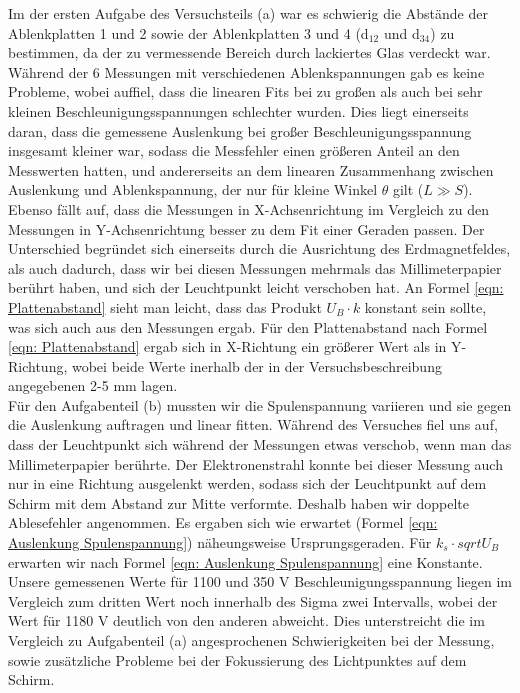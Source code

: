 \documentclass[12pt]{scrartcl}
\begin{document}
Im der ersten Aufgabe des Versuchsteils (a)
war es schwierig die Abstände der Ablenkplatten 1 und 2 sowie der Ablenkplatten 3 und 4 (d$_{12}$ und d$_{34}$) zu bestimmen, da der zu vermessende Bereich  durch lackiertes Glas verdeckt war.\\
Während der 6 Messungen mit verschiedenen Ablenkspannungen gab es keine Probleme, wobei auffiel, dass die linearen Fits bei zu großen als auch bei sehr kleinen Beschleunigungsspannungen schlechter wurden.
Dies liegt einerseits daran, dass die gemessene Auslenkung bei großer Beschleunigungsspannung insgesamt kleiner war, sodass die Messfehler einen größeren Anteil an den Messwerten hatten, und andererseits an dem linearen Zusammenhang zwischen Auslenkung und Ablenkspannung, der nur für kleine Winkel $\theta$ gilt ($L \gg S$).
Ebenso fällt auf, dass die Messungen in X-Achsenrichtung im Vergleich zu den Messungen in Y-Achsenrichtung besser zu dem Fit einer Geraden passen. Der Unterschied begründet sich einerseits durch die Ausrichtung des Erdmagnetfeldes, als auch dadurch, dass wir bei diesen Messungen mehrmals das Millimeterpapier berührt haben, und sich der Leuchtpunkt leicht verschoben hat.
An Formel \ref{eqn: Plattenabstand} sieht man leicht, dass das Produkt $U_B \cdot k$ konstant sein sollte, was sich auch aus den Messungen ergab.
Für den Plattenabstand nach Formel \ref{eqn: Plattenabstand} ergab sich in X-Richtung ein größerer Wert als in Y-Richtung, wobei beide Werte inerhalb der in der Versuchsbeschreibung angegebenen 2-5 mm lagen.\\
Für den Aufgabenteil (b) mussten wir die Spulenspannung variieren und sie gegen die Auslenkung auftragen und linear fitten.
Während des Versuches fiel uns auf, dass der Leuchtpunkt sich während der Messungen etwas verschob, wenn man das Millimeterpapier berührte. Der Elektronenstrahl konnte bei dieser Messung auch nur in eine Richtung ausgelenkt werden, sodass sich der Leuchtpunkt auf dem Schirm mit dem Abstand zur Mitte verformte. Deshalb haben wir doppelte Ablesefehler angenommen.
Es ergaben sich wie erwartet (Formel \ref{eqn: Auslenkung Spulenspannung}) näheungsweise Ursprungsgeraden.
Für $k_s \cdot sqrt{U_B}$ erwarten wir nach Formel \ref{eqn: Auslenkung Spulenspannung} eine Konstante. Unsere gemessenen Werte für 1100 und 350 V Beschleunigungsspannung liegen im Vergleich zum dritten Wert noch innerhalb des Sigma zwei Intervalls, wobei der Wert für 1180 V deutlich von den anderen abweicht.
Dies unterstreicht die im Vergleich zu Aufgabenteil (a) angesprochenen Schwierigkeiten bei der Messung, sowie zusätzliche Probleme bei der Fokussierung des Lichtpunktes auf dem Schirm.
\end{document}

